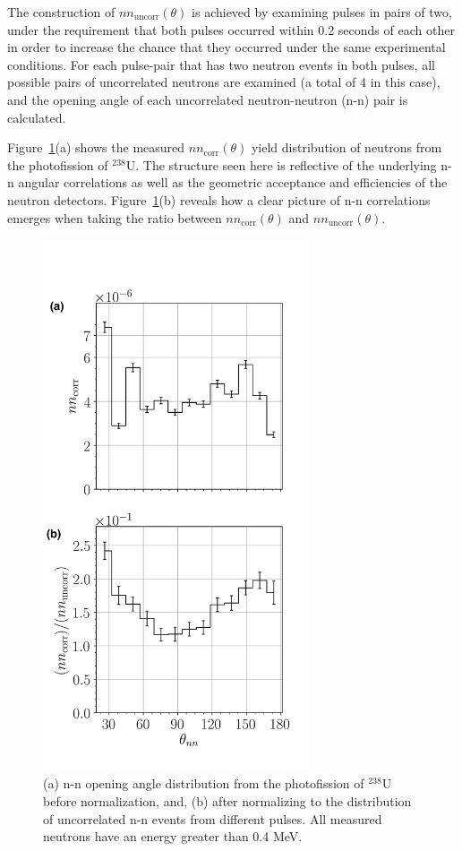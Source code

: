 The construction of $nn_{\text{uncorr}}(\theta)$ is achieved by examining pulses in pairs of two, under the requirement that both pulses occurred within 0.2 seconds of each other in order to increase the chance that they occurred under the same experimental conditions.
For each pulse-pair that has two neutron events in both pulses, all possible pairs of uncorrelated neutrons are examined (a total of 4 in this case), and the opening angle of each uncorrelated neutron-neutron (n-n) pair is calculated.

Figure~\ref{fig:SPDPNormalization}(a) shows the measured $nn_{\text{corr}}(\theta)$ yield distribution of neutrons from the photofission of $^{238}$U.
The structure seen here is reflective of the underlying n-n angular correlations as well as the geometric acceptance and efficiencies of the neutron detectors.
Figure~\ref{fig:SPDPNormalization}(b) reveals how a clear picture of n-n correlations emerges when taking the ratio between $nn_{\text{corr}}(\theta)$ and $nn_{\text{uncorr}}(\theta)$.
\begin{figure}[]
\centering
    \includegraphics[width=0.7\textwidth]{Content/Methods/SPDPNormalization.png}
    \caption{(a) n-n opening angle distribution from the photofission of $^{238}$U before normalization, and, (b) after normalizing to the distribution of uncorrelated n-n events from different pulses.
    All measured neutrons have an energy greater than 0.4 MeV.}
    \label{fig:SPDPNormalization}
\end{figure}

